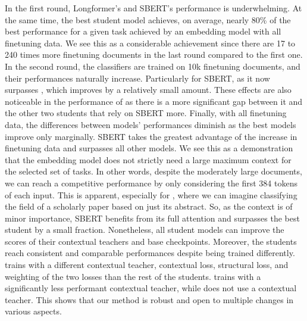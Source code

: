 In the first round, Longformer's and SBERT's performance is underwhelming. At
the same time, the best student model achieves, on average, nearly 80\% of the
best performance for a given task achieved by an embedding model with all
finetuning data. We see this as a considerable achievement since there are 17
to 240 times more finetuning documents in the last round compared to the first
one. In the second round, the classifiers are trained on 10k finetuning
documents, and their performances naturally increase. Particularly for SBERT, as
it now surpasses , which improves by a relatively small amount. These
effects are also noticeable in the performance of {\CosineStudent} as there is
a more significant gap between it and the other two students that rely on
SBERT more. Finally, with all finetuning data, the differences between models'
performances diminish as the best models improve only marginally. SBERT takes
the greatest advantage of the increase in finetuning data and surpasses all
other models. We see this as a demonstration that the embedding model does not
strictly need a large maximum context for the selected set of tasks. In other
words, despite the moderately large documents, we can reach a competitive
performance by only considering the first 384 tokens of each input. This is
apparent, especially for , where we can imagine classifying the
field of a scholarly paper based on just its abstract. So, as the context is of
minor importance, SBERT benefits from its full attention and surpasses the best
student by a small fraction. Nonetheless, all student models can improve the
scores of their contextual teachers and base checkpoints. Moreover, the
students reach consistent and comparable performances despite being trained
differently. {\CosineStudent} trains with a different contextual teacher,
contextual loss, structural loss, and weighting of the two losses than the rest
of the students. {\MSEStudent} trains with a significantly less performant
contextual teacher, while {\OnlyMSEStudent} does not use a contextual teacher.
This shows that our method is robust and open to multiple changes in various
aspects.

